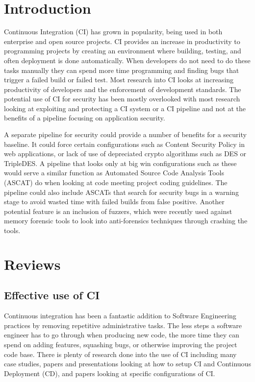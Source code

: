 \section{Introduction}
    Continuous Integration (CI) has grown in popularity, being used in both enterprise and open source projects. CI provides an increase in productivity to programming projects by creating an environment where building, testing, and often deployment is done automatically. When developers do not need to do these tasks manually they can spend more time programming and finding bugs that trigger a failed build or failed test. Most research into CI looks at increasing productivity of developers and the enforcement of development standards. The potential use of CI for security has been mostly overlooked with most research looking at exploiting and protecting a CI system or a CI pipeline and not at the benefits of a pipeline focusing on application security.

	A separate pipeline for security could provide a number of benefits for a security baseline. It could force certain configurations such as Content Security Policy in web applications, or lack of use of depreciated crypto algorithms such as DES or TripleDES\cite{Vehent}. A pipeline that looks only at big win configurations such as these would serve a similar function as Automated Source Code Analysis Tools (ASCAT) do when looking at code meeting project coding
    guidelines\cite{Zampetti}. The pipeline could also include ASCATs that search for security bugs in a warning stage to avoid wasted time with failed builds from false positive. Another potential feature is an inclusion of fuzzers, which were recently used against memory forensic tools to look into anti-forensics techniques through crashing the tools\cite{Case}.

\section{Reviews}
\subsection{Effective use of CI}
	Continuous integration has been a fantastic addition to Software Engineering practices by removing repetitive administrative tasks. The less steps a software engineer has to go through when producing new code, the more time they can spend on adding features, squashing bugs, or otherwise improving the project code base. There is plenty of research done into the use of CI including many case studies, papers and presentations looking at how to setup CI and Continuous Deployment (CD), and papers looking at specific configurations of CI.
	
